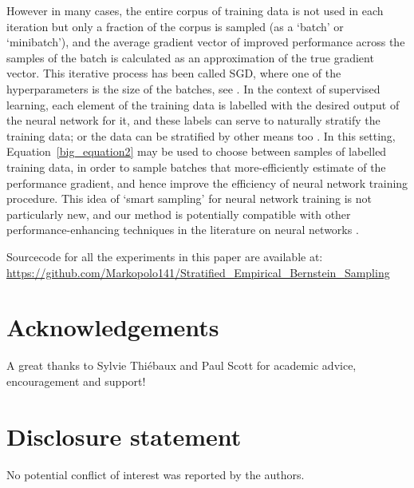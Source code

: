 \documentclass[]{interact}
\theoremstyle{plain}%
\theoremstyle{definition}
\theoremstyle{remark}
\begin{document}
However in many cases, the entire corpus of training data is not used in each iteration but only a fraction of the corpus is sampled (as a `batch' or `minibatch'), and the average gradient vector of improved performance across the samples of the batch is calculated as an approximation of the true gradient vector. 
This iterative process has been called SGD, where one of the hyperparameters is the size of the batches, see \cite{DBLP:journals/corr/KeskarMNST16,l.2018dont}.
In the context of supervised learning, each element of the training data is labelled with the desired output of the neural network for it, and these labels can serve to naturally stratify the training data; or the data can be stratified by other means too \citep{DBLP:journals/corr/ZhangKM17,DBLP:journals/corr/abs-1804-02772,2014arXiv1405.3080Z}.
In this setting, Equation~\ref{big_equation2} may be used to choose between samples of labelled training data, in order to sample batches that more-efficiently estimate of the performance gradient, and hence improve the efficiency of neural network training procedure.
This idea of `smart sampling' for neural network training is not particularly new, and our method is potentially compatible with other performance-enhancing techniques in the literature on neural networks \citep{10.1007/978-3-319-24486-0_21,article123123131}.

Sourcecode for all the experiments in this paper are available at:\\ \href{https://github.com/Markopolo141/Stratified\_Empirical\_Bernstein\_Sampling}{https://github.com/Markopolo141/Stratified\_Empirical\_Bernstein\_Sampling
}


\section*{Acknowledgements}
A great thanks to Sylvie Thi\'{e}baux and Paul Scott for academic advice, encouragement and support!

\section*{Disclosure statement}
No potential conflict of interest was reported by the authors.
\end{document}
